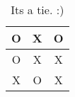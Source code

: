 \begin{table}[htbp]
    \centering
    \begin{tabular}{||c|c|c||} \hline\hline
        O & X & O \\ \hline
        O & X & X \\ \hline
        X & O & X \\ \hline \hline
    
    \end{tabular}
    \label{tab:tabulita}
    \caption{Its a tie. :)}
\end{table}
